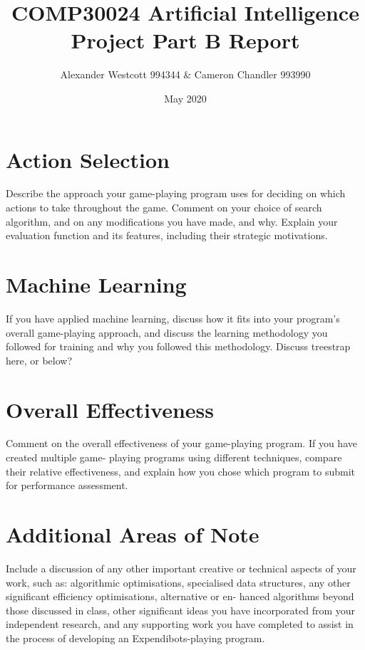 \documentclass[a4paper,11pt]{article}
\author{Alexander Westcott 994344 \& Cameron Chandler 993990}
\title{COMP30024 Artificial Intelligence Project Part B Report}
\date{May 2020}
\begin{document}
\maketitle






\section{Action Selection}
Describe the approach your game-playing program uses for deciding on which actions to take throughout
the game. Comment on your choice of search algorithm, and on any modifications you have made, and
why. Explain your evaluation function and its features, including their strategic motivations.

\section{Machine Learning}
If you have applied machine learning, discuss how it fits into your program’s overall game-playing approach,
and discuss the learning methodology you followed for training and why you followed this methodology.
Discuss treestrap here, or below? 

\section{Overall Effectiveness}
Comment on the overall effectiveness of your game-playing program. If you have created multiple game-
playing programs using different techniques, compare their relative effectiveness, and explain how you chose
which program to submit for performance assessment.


\section{Additional Areas of Note}
Include a discussion of any other important creative or technical aspects of your work, such as: algorithmic
optimisations, specialised data structures, any other significant efficiency optimisations, alternative or en-
hanced algorithms beyond those discussed in class, other significant ideas you have incorporated from your
independent research, and any supporting work you have completed to assist in the process of developing
an Expendibots-playing program.
\end{document}
